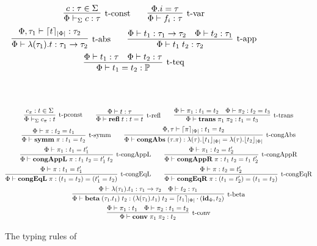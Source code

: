 \documentclass[10pt]{article}
\begin{document}
\begin{figure}[ht!]
\begin{gather*}  
\infer[\mbox{\typconst}]{
  \typeof{\Si}{\Phi}{c}{\tau}
}{
  c:\tau \in \Si
}
\qquad
\infer[\mbox{\typvar}]{
  \tyof{\Phi}{f_i}{\tau}
}{
  \Phi.i = \tau
}
\\
\infer[\mbox{\typabs}]{
  \tyof{\Phi}{\dtabs{\tau_1}{t}}{\tau_1 \to \tau_2}
}{
  \tyof{\Phi,\tau_1}{\fresheningz{t}{\len{\Phi}}}{\tau_2}
}
\qquad
\infer[\mbox{\typapp}]{
  \tyof{\Phi}{t_1\app t_2}{\tau_2}
}{
  \tyof{\Phi}{t_1}{\tau_1 \to \tau_2}
  &
  \tyof{\Phi}{t_2}{\tau_1}
}
\\
\infer[\mbox{\typteq}]{
  \tyof{\Phi}{t_1 = t_2}{\prop}
}{
  \tyof{\Phi}{t_1}{\tau}
  &
  \tyof{\Phi}{t_2}{\tau}
}
\end{gather*}
\\
\\
\begin{gather*}
\infer[\mbox{\typpconst}]{
  \typeof{\Si}{\Phi}{c_\pi}{t}
}{
  c_\pi:t \in \Sigma
}
\qquad
\infer[\mbox{\typrefl}]{
  \tyof{\Phi}{\refl t}{t = t}
}{
  \tyof{\Phi}{t}{\tau}
}
\qquad
\infer[\mbox{\typtrans}]{
  \tyof{\Phi}{\trans{\pi_1}{\pi_2}}{t_1 = t_3}
}{
  \tyof{\Phi}{\pi_1}{t_1 = t_2}
  &
  \tyof{\Phi}{\pi_2}{t_2 = t_3}
}
\\
\infer[\mbox{\typsymm}]{
  \tyof{\Phi}{\symm{\pi}}{t_1 = t_2}
}{
  \tyof{\Phi}{\pi}{t_2 = t_1}
}
\qquad
\infer[\mbox{\typcongabs}]{
  \tyof{\Phi}{\dcongtabs{\tau}{\pi}}{\dtabs{\tau}
    {\bindingz{t_1}{\len{\Phi}}} = \dtabs{\tau}{\bindingz{t_2}{\len{\Phi}}}}
}{
  \tyof{\Phi,\tau}{\fresheningz{\pi}{\len{\Phi}}}{t_1 = t_2}
}
\\
\infer[\mbox{\typcongappl}]{
  \tyof{\Phi}{\congappl{\pi}}{t_1\app t_2 = t_1'\app t_2}
}{
  \tyof{\Phi}{\pi_1}{t_1 = t_1'}
}
\qquad
\infer[\mbox{\typcongappr}]{
  \tyof{\Phi}{\congappr{\pi}}{t_1\app t_2 = t_1\app t_2'}
}{
  \tyof{\Phi}{\pi_1}{t_2 = t_2'}
}
\\
\infer[\mbox{\typcongeql}]{
  \tyof{\Phi}{\congeql{\pi}}{(t_1 = t_2) = (t_1' = t_2)}
}{
  \tyof{\Phi}{\pi}{t_1 = t_1'}
}
\qquad
\infer[\mbox{\typcongeqr}]{
  \tyof{\Phi}{\congeqr{\pi}}{(t_1 = t_2') = (t_1 = t_2)}
}{
  \tyof{\Phi}{\pi}{t_2 = t_2'}
}
\\
\infer[\mbox{\typbeta}]{
  \tyof{\Phi}{\dtbetaconv{\tau_1}{t_1}{t_2}}
       {(\dtabs{\tau_1}{t_1})\app t_2 = \subst{\fresheningz{t_1}{\len{\Phi}}}{(\idsubst{\Phi},t_2)}}
}{
  \tyof{\Phi}{\dtabs{\tau_1}{t_1}}{\tau_1 \to \tau_2}
  &
  \tyof{\Phi}{t_2}{\tau_1}
}
\\
\infer[\mbox{\typconv}]{
  \tyof{\Phi}{\conv{\pi_1}{\pi_2}}{t_2}
}{
  \tyof{\Phi}{\pi_1}{t_1}
  &
  \tyof{\Phi}{\pi_2}{t_1 = t_2}
}
\end{gather*}  
  
\caption{The typing rules of \STLCD}
\label{fig:stlcd-typing-rules}
\end{figure}
\end{document}
